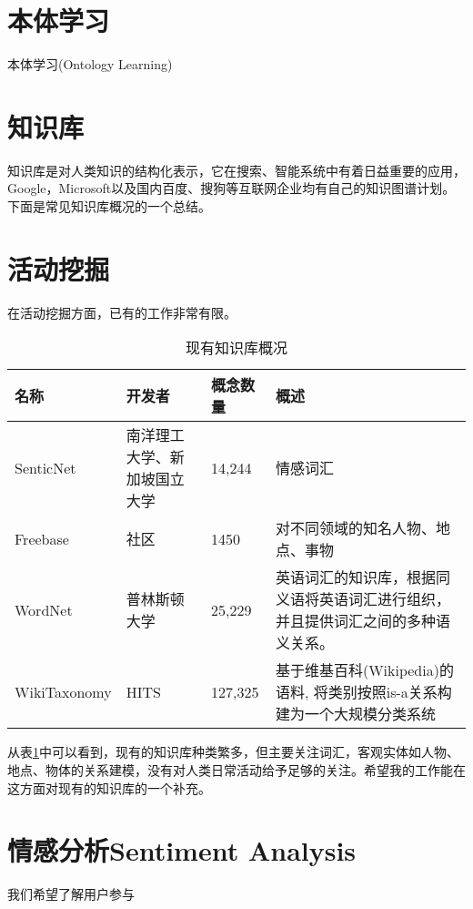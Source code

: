 \section{本体学习}
本体学习(Ontology Learning)


\section{知识库}
知识库是对人类知识的结构化表示，它在搜索、智能系统中有着日益重要的应用，Google，Microsoft以及国内百度、搜狗等互联网企业均有自己的知识图谱计划。下面是常见知识库概况的一个总结。
\section{活动挖掘}
在活动挖掘方面，已有的工作非常有限。

\begin{table}[!h]
\begin{tabular}[0.7\textwidth]{|l|p{2cm}|l|p{4cm}|}
\hline
名称 & 开发者 & 概念数量  & 概述 \\
\hline
SenticNet & 南洋理工大学、新加坡国立大学 & 14,244	& 情感词汇  \\
\hline
Freebase & 社区	& 1450	& 对不同领域的知名人物、地点、事物 \\
\hline
WordNet\cite{miller1995wordnet} & 普林斯顿大学 & 25,229 & 英语词汇的知识库，根据同义语将英语词汇进行组织，并且提供词汇之间的多种语义关系。 \\
\hline
WikiTaxonomy\cite{ponzetto2007deriving}	& HITS & 127,325 & 基于维基百科(Wikipedia)的语料, 将类别按照is-a关系构建为一个大规模分类系统 \\
\hline
\end{tabular}
\caption{现有知识库概况}
\label{table:knowledge_base}
\end{table}

从表\ref{table:knowledge_base}中可以看到，现有的知识库种类繁多，但主要关注词汇，客观实体如人物、地点、物体的关系建模，没有对人类日常活动给予足够的关注。希望我的工作能在这方面对现有的知识库的一个补充。

\section{情感分析Sentiment Analysis}
我们希望了解用户参与
